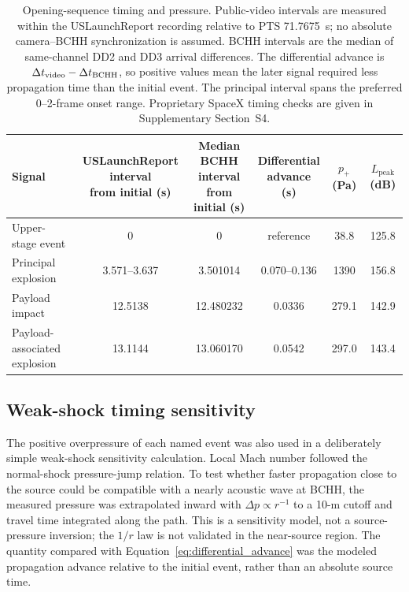 \documentclass[]{seismica}
\begin{document}
\begin{table}[!tbp]
\caption{Opening-sequence timing and pressure. Public-video intervals are
measured within the USLaunchReport recording relative to PTS 71.7675~s; no
absolute camera--BCHH synchronization is assumed. BCHH intervals are the
median of same-channel DD2 and DD3 arrival differences. The differential
advance is $\Delta t_{\rm video}-\Delta t_{\rm BCHH}$, so positive values mean
the later signal required less propagation time than the initial event. The
principal interval spans the preferred 0--2-frame onset range. Proprietary
SpaceX timing checks are given in Supplementary Section~S4.}
\label{tab:principal_events}
\centering
\small
\begin{tabularx}{\textwidth}{Xccccc}
\hline
Signal &
\shortstack{USLaunchReport interval\\from initial (s)} &
\shortstack{Median BCHH interval\\from initial (s)} &
\shortstack{Differential\\advance (s)} &
$p_+$ (Pa) &
\shortstack{$L_{\mathrm{peak}}$\\(dB)} \\
\hline
Upper-stage event & 0 & 0 & reference & 38.8 & 125.8 \\
Principal explosion & 3.571--3.637 & 3.501014 & 0.070--0.136 & 1390 & 156.8 \\
Payload impact & 12.5138 & 12.480232 & 0.0336 & 279.1 & 142.9 \\
Payload-associated explosion & 13.1144 & 13.060170 & 0.0542 & 297.0 & 143.4 \\
\hline
\end{tabularx}
\end{table}

\subsection{Weak-shock timing sensitivity}

The positive overpressure of each named event was also used in a deliberately
simple weak-shock sensitivity calculation. Local Mach number followed the
normal-shock pressure-jump relation. To test whether faster propagation close
to the source could be compatible with a nearly acoustic wave at BCHH, the
measured pressure was extrapolated inward with $\Delta p\propto r^{-1}$ to a
10-m cutoff and travel time integrated along the path. This is a sensitivity
model, not a source-pressure inversion; the $1/r$ law is not validated in the
near-source region. The quantity compared with Equation~\ref{eq:differential_advance}
was the modeled propagation advance relative to the initial event, rather than
an absolute source time.
\end{document}
